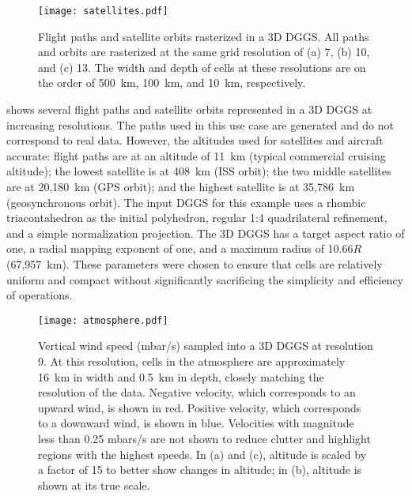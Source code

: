\begin{figure}[ht!]
	\centering
	\texttt{[image: satellites.pdf]}
	\caption[Flight path and satellite orbit use case showing several sample trajectories]{
		Flight paths and satellite orbits rasterized in a 3D DGGS.
		All paths and orbits are rasterized at the same grid resolution of (a) 7, (b) 10, and (c) 13.
		The width and depth of cells at these resolutions are on the order of 500~km, 100~km, and 10~km, respectively.
	}
	\label{fig:satellites}
\end{figure}


 shows several flight paths and satellite orbits represented in a 3D DGGS at increasing resolutions.
The paths used in this use case are generated and do not correspond to real data.
However, the altitudes used for satellites and aircraft  accurate:
flight paths are at an altitude of 11~km (typical commercial cruising altitude); the lowest satellite is at 408~km (ISS orbit); the two middle satellites are at 20,180~km (GPS orbit); and the highest satellite is at 35,786~km (geosynchronous orbit).
The input DGGS for this example uses a rhombic triacontahedron as the initial polyhedron, regular 1:4 quadrilateral refinement, and a simple normalization projection.
The 3D DGGS has a target aspect ratio of one, a radial mapping exponent of one, and a maximum radius of 10.66$R$ (67,957~km).
These parameters were chosen to ensure that cells are relatively uniform and compact without significantly sacrificing the simplicity and efficiency of operations.

\begin{figure}[b!]
	\centering
	\texttt{[image: atmosphere.pdf]}
	\caption[Atmospheric properties resampling use case showing vertical wind speed]{
		Vertical wind speed (mbar/s) sampled into a 3D DGGS at resolution 9.
		At this resolution, cells in the atmosphere are approximately 16~km in width and 0.5~km in depth, closely matching the resolution of the data.
		Negative velocity, which corresponds to an upward wind, is shown in red.
		Positive velocity, which corresponds to a downward wind, is shown in blue.
		Velocities with magnitude less than 0.25 mbars/s are not shown to reduce clutter and highlight regions with the highest speeds.
		In (a) and (c), altitude is scaled by a factor of 15 to better show changes in altitude; in (b), altitude is shown at its true scale.
	}
	\label{fig:atmosphere}
\end{figure}

